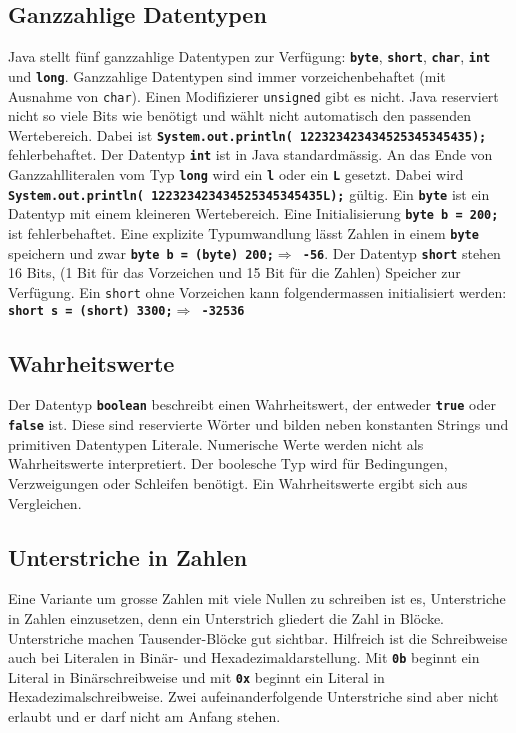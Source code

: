 \subsection{Ganzzahlige Datentypen}
Java stellt fünf ganzzahlige Datentypen zur Verfügung: \textbf{\texttt{byte}}, \textbf{\texttt{short}}, \textbf{\texttt{char}}, \textbf{\texttt{int}} und \textbf{\texttt{long}}. Ganzzahlige Datentypen sind immer vorzeichenbehaftet (mit Ausnahme von \texttt{char}). Einen Modifizierer \texttt{unsigned} gibt es nicht. Java reserviert nicht so viele Bits wie benötigt und wählt nicht automatisch den passenden Wertebereich. Dabei ist \textbf{\texttt{System.out.println( 122323423434525345345435);}} fehlerbehaftet. Der Datentyp \textbf{\texttt{int}} ist in Java standardmässig.
\newline\newline
An das Ende von Ganzzahlliteralen vom Typ \textbf{\texttt{long}} wird ein \textbf{\texttt{l}} oder ein \textbf{\texttt{L}} gesetzt. Dabei wird \textbf{\texttt{System.out.println( 122323423434525345345435L);}} gültig.
\newline\newline
Ein \textbf{\texttt{byte}} ist ein Datentyp mit einem kleineren Wertebereich. Eine Initialisierung \textbf{\texttt{byte b = 200;}} ist fehlerbehaftet. Eine explizite Typumwandlung lässt Zahlen in einem \textbf{\texttt{byte}} speichern und zwar \textbf{\texttt{byte b = (byte) 200;$\Longrightarrow$ -56}}.
\newline\newline
Der Datentyp \textbf{\texttt{short}} stehen 16 Bits, (1 Bit für das Vorzeichen und 15 Bit für die Zahlen) Speicher zur Verfügung. Ein \texttt{short} ohne Vorzeichen kann folgendermassen initialisiert werden: \textbf{\texttt{short s = (short) 3300;$\Longrightarrow$ -32536}}
\subsection{Wahrheitswerte}
Der Datentyp \textbf{\texttt{boolean}} beschreibt einen Wahrheitswert, der entweder \textbf{\texttt{true}} oder \textbf{\texttt{false}} ist. Diese sind reservierte Wörter und bilden neben konstanten Strings und primitiven Datentypen Literale. Numerische Werte werden nicht als Wahrheitswerte interpretiert. Der boolesche Typ wird für Bedingungen, Verzweigungen oder Schleifen benötigt. Ein Wahrheitswerte ergibt sich aus Vergleichen.
\subsection{Unterstriche in Zahlen}
Eine Variante um grosse Zahlen mit viele Nullen zu schreiben ist es, Unterstriche in Zahlen einzusetzen, denn ein Unterstrich gliedert die Zahl in Blöcke. Unterstriche machen Tausender-Blöcke gut sichtbar. Hilfreich ist die Schreibweise auch bei Literalen in Binär- und Hexadezimaldarstellung. Mit \textbf{\texttt{0b}} beginnt ein Literal in Binärschreibweise und mit \textbf{\texttt{0x}} beginnt ein Literal in Hexadezimalschreibweise. Zwei aufeinanderfolgende Unterstriche sind aber nicht erlaubt und er darf nicht am Anfang stehen.
